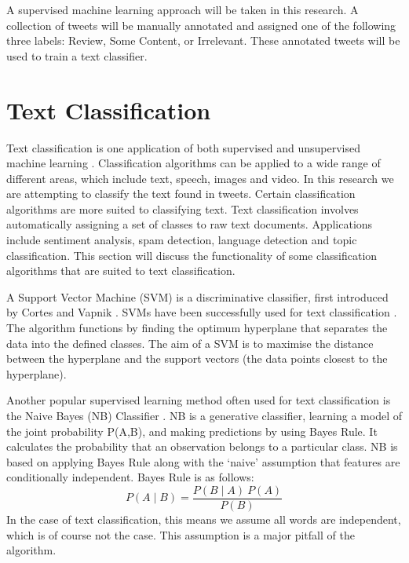 A supervised machine learning approach will be taken in this research. A collection of tweets will be manually annotated and assigned one of the following three labels: Review, Some Content, or Irrelevant. These annotated tweets will be used to train a text classifier. 

\section{Text Classification}

Text classification is one application of both supervised and unsupervised machine learning \cite{khan2010}. Classification algorithms can be applied to a wide range of different areas, which include text, speech, images and video. In this research we are attempting to classify the text found in tweets. Certain classification algorithms are more suited to classifying text. Text classification involves automatically assigning a set of classes to raw text documents. Applications include sentiment analysis, spam detection, language detection and topic classification. This section will discuss the functionality of some classification algorithms that are suited to text classification. 



A Support Vector Machine (SVM) is a discriminative classifier, first introduced by Cortes and Vapnik \cite{Vapnik1995,  Vapnik21995}. SVMs have been successfully used for text classification \cite{Joachims1998, tong2001support}. The algorithm functions by finding the optimum hyperplane that separates the data into the defined classes. The aim of a SVM is to maximise the distance between the hyperplane and the support vectors (the data points closest to the hyperplane). 

Another popular supervised learning method often used for text classification is the Naive Bayes (NB) Classifier  \cite{NaiveBayes1998}. NB is a generative classifier, learning a model of the joint probability P(A,B), and making predictions by using Bayes Rule. It calculates the probability that an observation belongs to a particular class. NB is based on applying Bayes Rule along with the ‘naive’ assumption that features are conditionally independent. Bayes Rule is as follows:
\begin{equation}
    P(A\mid B) = \frac{P(B\mid A)\:P(A)}{P(B)}
\end{equation}
In the case of text classification, this means we assume all words are independent, which is of course not the case. This assumption is a major pitfall of the algorithm. 

